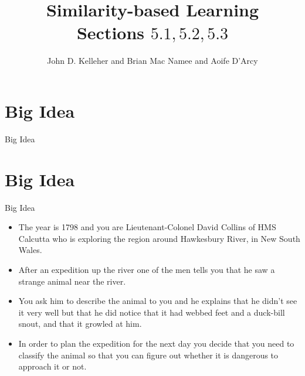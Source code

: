 \documentclass[xcolor={table}]{beamer}
\title{Similarity-based Learning\\Sections $5.1, 5.2, 5.3$}
\author{John D. Kelleher and Brian Mac Namee and Aoife D'Arcy}
\institute{}
\date{}
\newcommand{\SectionSlide}[2][]{
	\ifthenelse{\isempty{#1}}
		{\section{#2}\begin{frame} \begin{center}\begin{huge}#2\end{huge}\end{center}\end{frame}}
		{\section[#1]{#2}\begin{frame} \begin{center}\begin{huge}#2\end{huge}\end{center}\end{frame}}
}
\begin{document}
\begin{frame}
	\titlepage
\end{frame}
\begin{frame}
	 \tableofcontents
\end{frame}

\SectionSlide{Big Idea}

\begin{frame} 
\begin{itemize}
\item The year is 1798 and you are Lieutenant-Colonel David Collins of HMS Calcutta who is exploring the region around Hawkesbury River, in New South Wales. 
\item After an expedition up the river one of the men tells you that he saw a strange animal near the river.  
\item You ask him to describe the animal to you and he explains that he didn't see it very well but that he did notice that it had webbed feet and a duck-bill snout, and that it growled at him.
\item In order to plan the expedition for the next day you decide that you need to classify the animal so that you can figure out whether it is dangerous to approach it or not.  
\end{itemize}
\end{frame} 
\end{document}
